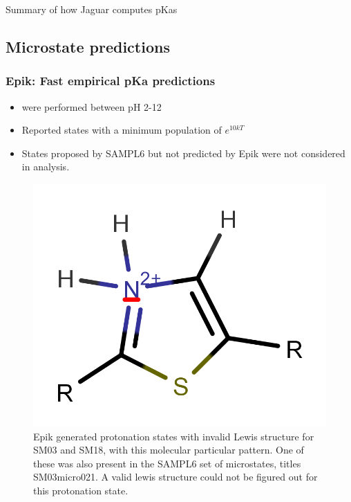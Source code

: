 \documentclass[9pt,lineno]{elife}
\begin{document}
Summary of how Jaguar computes pKas  

\subsection{Microstate predictions}

\subsubsection{Epik: Fast empirical pKa predictions}
\begin{itemize}
    \item were performed between pH 2-12
    \item Reported states with a minimum population of $e^{10 kT}$
    \item States proposed by SAMPL6 but not predicted by Epik were not considered in analysis.

\end{itemize}
\begin{figure}
    \centering
    \includegraphics{invalid-lewis-SM03-SM18.png}
    \caption{Epik generated protonation states with invalid Lewis structure for SM03 and SM18, with this 
    molecular particular pattern. One of these was also present in the SAMPL6 set of microstates, titles SM03\textunderscore{}micro021. A valid lewis structure could not be figured out for this protonation state.}
    \label{fig:lewis-structure-SM03-SM18}
\end{figure}
\end{document}
